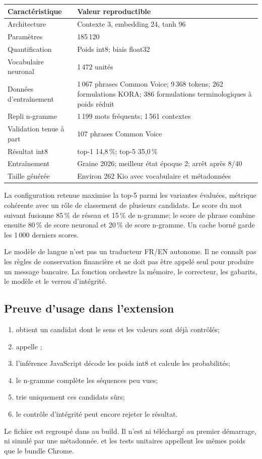 \begin{tabularx}{\linewidth}{@{}|L{50mm}|Y|@{}}
\hline
\textbf{Caractéristique} & \textbf{Valeur reproductible}\\
\hline
Architecture & Contexte 3, embedding 24, tanh 96\\
\hline
Paramètres & 185\,120\\
\hline
Quantification & Poids int8; biais float32\\
\hline
Vocabulaire neuronal & 1\,472 unités\\
\hline
Données d’entraînement &
1\,067 phrases Common Voice; 9\,368 tokens; 262 formulations KORA;
386 formulations terminologiques à poids réduit\\
\hline
Repli n-gramme & 1\,199 mots fréquents; 1\,561 contextes\\
\hline
Validation tenue à part & 107 phrases Common Voice\\
\hline
Résultat int8 & top-1 14,8\,\%; top-5 35,0\,\%\\
\hline
Entraînement & Graine 2026; meilleur état époque 2; arrêt après 8/40\\
\hline
Taille générée & Environ 262 Kio avec vocabulaire et métadonnées\\
\hline
\end{tabularx}

La configuration retenue maximise la top-5 parmi les variantes évaluées,
métrique cohérente avec un rôle de classement de plusieurs candidats. Le
score du mot suivant fusionne 85\,\% de réseau et 15\,\% de n-gramme; le score
de phrase combine ensuite 80\,\% de score neuronal et 20\,\% de score
n-gramme. Un cache borné garde les 1\,000 derniers scores.

\begin{warningbox}
Le modèle de langue n’est pas un traducteur FR/EN autonome. Il ne connaît pas
les règles de conservation financière et ne doit pas être appelé seul pour
produire un message bancaire. La fonction  orchestre la
mémoire, le correcteur, les gabarits, le modèle et le verrou d’intégrité.
\end{warningbox}

\subsection{Preuve d’usage dans l’extension}

\begin{enumerate}
  \item {} obtient un candidat dont le sens et les valeurs
        sont déjà contrôlés;
  \item {} appelle ;
  \item l’inférence JavaScript décode les poids int8 et calcule les
        probabilités;
  \item le n-gramme complète les séquences peu vues;
  \item {} trie uniquement ces candidats sûrs;
  \item le contrôle d’intégrité peut encore rejeter le résultat.
\end{enumerate}

Le fichier  est regroupé dans
 au build. Il n’est ni téléchargé au premier démarrage, ni
simulé par une métadonnée.  et les tests unitaires
appellent les mêmes poids que le bundle Chrome.
